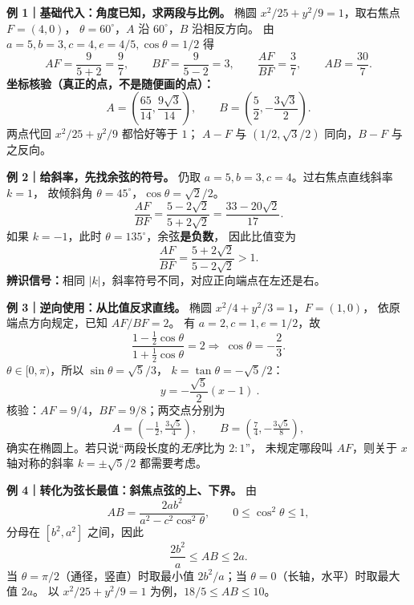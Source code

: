 \clearpage
\begin{examplebox}
\textbf{例 1｜基础代入：角度已知，求两段与比例。}
椭圆 $x^2/25+y^2/9=1$，取右焦点 $F=(4,0)$，
$\theta=60^\circ$，$A$ 沿 $60^\circ$，$B$ 沿相反方向。
由 $a=5,b=3,c=4,e=4/5,\cos\theta=1/2$ 得
\[
 AF=\frac9{5+2}=\frac97,\qquad
 BF=\frac9{5-2}=3,\qquad
 \boxed{\frac{AF}{BF}=\frac37},\qquad
 \boxed{AB=\frac{30}{7}}.
\]
\textbf{坐标核验（真正的点，不是随便画的点）：}
\[
 A=\left(\frac{65}{14},\frac{9\sqrt3}{14}\right),\qquad
 B=\left(\frac52,-\frac{3\sqrt3}{2}\right).
\]
两点代回 $x^2/25+y^2/9$ 都恰好等于 $1$；
$A-F$ 与 $(1/2,\sqrt3/2)$ 同向，$B-F$ 与之反向。
\end{examplebox}

\clearpage
\begin{examplebox}
\textbf{例 2｜给斜率，先找余弦的符号。}
仍取 $a=5,b=3,c=4$。过右焦点直线斜率 $k=1$，
故倾斜角 $\theta=45^\circ$，$\cos\theta=\sqrt2/2$。
\[
 \boxed{\frac{AF}{BF}
 =\frac{5-2\sqrt2}{5+2\sqrt2}
 =\frac{33-20\sqrt2}{17}}.
\]
如果 $k=-1$，此时 $\theta=135^\circ$，余弦\textbf{是负数}，
因此比值变为
\[
 \boxed{\frac{AF}{BF}=\frac{5+2\sqrt2}{5-2\sqrt2}>1}.
\]
\textbf{辨识信号：}相同 $|k|$，斜率符号不同，对应正向端点在左还是右。
\end{examplebox}

\clearpage
\begin{examplebox}
\textbf{例 3｜逆向使用：从比值反求直线。}
椭圆 $x^2/4+y^2/3=1$，$F=(1,0)$，
依原端点方向规定，已知 $AF/BF=2$。
有 $a=2,c=1,e=1/2$，故
\[
 \frac{1-\tfrac12\cos\theta}{1+\tfrac12\cos\theta}=2
 \Longrightarrow\ \cos\theta=-\frac23.
\]
$\theta\in[0,\pi)$，所以 $\sin\theta=\sqrt5/3$，
$k=\tan\theta=-\sqrt5/2$：
\[
 \boxed{\ y=-\frac{\sqrt5}{2}(x-1)\ }.
\]
核验：$AF=9/4$，$BF=9/8$；两交点分别为
\[
 A=\left(-\tfrac12,\tfrac{3\sqrt5}{4}\right),\qquad
 B=\left(\tfrac74,-\tfrac{3\sqrt5}{8}\right),
\]
确实在椭圆上。若只说``两段长度的\emph{无序}比为 $2:1$''，
未规定哪段叫 $AF$，则关于 $x$ 轴对称的斜率
$k=\pm\sqrt5/2$ 都需要考虑。
\end{examplebox}

\clearpage
\begin{examplebox}
\begin{center}\end{center}
\textbf{例 4｜转化为弦长最值：斜焦点弦的上、下界。}
由
\[
 AB=\frac{2ab^2}{a^2-c^2\cos^2\theta},\qquad
 0\le \cos^2\theta\le1,
\]
分母在 $[b^2,a^2]$ 之间，因此
\[
 \boxed{\frac{2b^2}{a}\le AB\le2a}.
\]
当 $\theta=\pi/2$（通径，竖直）时取最小值
$2b^2/a$；当 $\theta=0$（长轴，水平）时取最大值 $2a$。
以 $x^2/25+y^2/9=1$ 为例，$\boxed{18/5\le AB\le10}$。
\end{examplebox}

